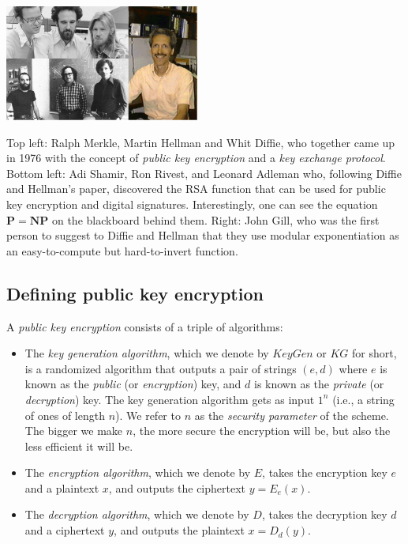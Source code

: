 \begin{marginfigure}
\centering
\includegraphics[width=\linewidth, height=1.5in, keepaspectratio]{../figure/rsadhmg.png}
\caption{Top left: Ralph Merkle, Martin Hellman and Whit Diffie, who
together came up in 1976 with the concept of \emph{public key
encryption} and a \emph{key exchange protocol}. Bottom left: Adi Shamir,
Ron Rivest, and Leonard Adleman who, following Diffie and Hellman's
paper, discovered the RSA function that can be used for public key
encryption and digital signatures. Interestingly, one can see the
equation \(\mathbf{P}=\mathbf{NP}\) on the blackboard behind them.
Right: John Gill, who was the first person to suggest to Diffie and
Hellman that they use modular exponentiation as an easy-to-compute but
hard-to-invert function.}
\label{diffiehellmanmerklegillfig}
\end{marginfigure}

\subsection{Defining public key
encryption}\label{Defining-public-key-encry}

A \emph{public key encryption} consists of a triple of algorithms:

\begin{itemize}
\item
  The \emph{key generation algorithm}, which we denote by \(KeyGen\) or
  \(\ensuremath{\mathit{KG}}\) for short, is a randomized algorithm that
  outputs a pair of strings \((e,d)\) where \(e\) is known as the
  \emph{public} (or \emph{encryption}) key, and \(d\) is known as the
  \emph{private} (or \emph{decryption}) key. The key generation
  algorithm gets as input \(1^n\) (i.e., a string of ones of length
  \(n\)). We refer to \(n\) as the \emph{security parameter} of the
  scheme. The bigger we make \(n\), the more secure the encryption will
  be, but also the less efficient it will be.
\item
  The \emph{encryption algorithm}, which we denote by \(E\), takes the
  encryption key \(e\) and a plaintext \(x\), and outputs the ciphertext
  \(y=E_e(x)\).
\item
  The \emph{decryption algorithm}, which we denote by \(D\), takes the
  decryption key \(d\) and a ciphertext \(y\), and outputs the plaintext
  \(x=D_d(y)\).
\end{itemize}


